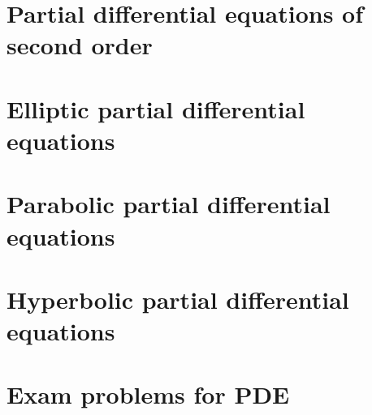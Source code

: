 \documentclass[a4paper,12pt]{book}
\begin{document}

\chapter{Partial differential equations of second order}

\chapter{Elliptic partial differential equations}

\chapter{Parabolic partial differential equations}

\chapter{Hyperbolic partial differential equations}

%
\chapter{Exam problems for PDE}

\end{document}
